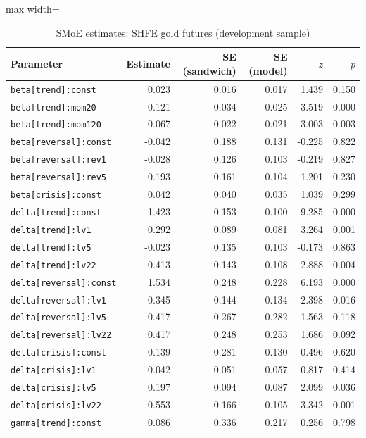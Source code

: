 \begin{table}[!htbp]\centering\scriptsize
\caption{SMoE estimates: SHFE gold futures (development sample)}\label{tab:params_au_main}
\begin{adjustbox}{max width=\textwidth}
\begin{tabular}{lrrrrr}
\toprule
Parameter & Estimate & SE (sandwich) & SE (model) & $z$ & $p$\\
\midrule
\texttt{beta[trend]:const} & 0.023 & 0.016 & 0.017 & 1.439 & 0.150\\
\texttt{beta[trend]:mom20} & -0.121 & 0.034 & 0.025 & -3.519 & 0.000\\
\texttt{beta[trend]:mom120} & 0.067 & 0.022 & 0.021 & 3.003 & 0.003\\
\texttt{beta[reversal]:const} & -0.042 & 0.188 & 0.131 & -0.225 & 0.822\\
\texttt{beta[reversal]:rev1} & -0.028 & 0.126 & 0.103 & -0.219 & 0.827\\
\texttt{beta[reversal]:rev5} & 0.193 & 0.161 & 0.104 & 1.201 & 0.230\\
\texttt{beta[crisis]:const} & 0.042 & 0.040 & 0.035 & 1.039 & 0.299\\
\texttt{delta[trend]:const} & -1.423 & 0.153 & 0.100 & -9.285 & 0.000\\
\texttt{delta[trend]:lv1} & 0.292 & 0.089 & 0.081 & 3.264 & 0.001\\
\texttt{delta[trend]:lv5} & -0.023 & 0.135 & 0.103 & -0.173 & 0.863\\
\texttt{delta[trend]:lv22} & 0.413 & 0.143 & 0.108 & 2.888 & 0.004\\
\texttt{delta[reversal]:const} & 1.534 & 0.248 & 0.228 & 6.193 & 0.000\\
\texttt{delta[reversal]:lv1} & -0.345 & 0.144 & 0.134 & -2.398 & 0.016\\
\texttt{delta[reversal]:lv5} & 0.417 & 0.267 & 0.282 & 1.563 & 0.118\\
\texttt{delta[reversal]:lv22} & 0.417 & 0.248 & 0.253 & 1.686 & 0.092\\
\texttt{delta[crisis]:const} & 0.139 & 0.281 & 0.130 & 0.496 & 0.620\\
\texttt{delta[crisis]:lv1} & 0.042 & 0.051 & 0.057 & 0.817 & 0.414\\
\texttt{delta[crisis]:lv5} & 0.197 & 0.094 & 0.087 & 2.099 & 0.036\\
\texttt{delta[crisis]:lv22} & 0.553 & 0.166 & 0.105 & 3.342 & 0.001\\
\texttt{gamma[trend]:const} & 0.086 & 0.336 & 0.217 & 0.256 & 0.798\\

\end{tabular}
\end{adjustbox}
\end{table}
